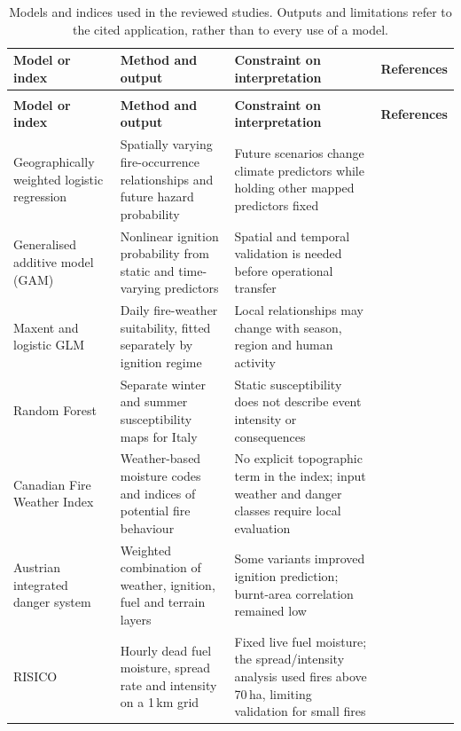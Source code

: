 \documentclass[11pt,a4paper]{article}
\begin{document}
\begingroup
\footnotesize
\setlength{\tabcolsep}{4pt}
\renewcommand{\arraystretch}{1.08}
\begin{longtable}{@{}>{\raggedright\arraybackslash}p{2.5cm} >{\raggedright\arraybackslash}p{3.6cm} >{\raggedright\arraybackslash}p{5.0cm} >{\raggedright\arraybackslash}p{3.5cm}@{}}
\caption{Models and indices used in the reviewed studies. Outputs and limitations refer to the cited application, rather than to every use of a model.}\label{tab:models}\\
\toprule
\textbf{Model or index} & \textbf{Method and output} & \textbf{Constraint on interpretation} & \textbf{References} \\
\midrule
\endfirsthead
\multicolumn{4}{l}{\tablename\ \thetable\ continued}\\
\toprule
\textbf{Model or index} & \textbf{Method and output} & \textbf{Constraint on interpretation} & \textbf{References} \\
\midrule
\endhead
\bottomrule
\endfoot
Geographically weighted logistic regression & Spatially varying fire-occurrence relationships and future hazard probability & Future scenarios change climate predictors while holding other mapped predictors fixed & \citep{gerberding_mapping_2025} \\
Generalised additive model (GAM) & Nonlinear ignition probability from static and time-varying predictors & Spatial and temporal validation is needed before operational transfer & \citep{moreno_1_nodate} \\
Maxent and logistic GLM & Daily fire-weather suitability, fitted separately by ignition regime & Local relationships may change with season, region and human activity & \citep{de_angelis_modelling_2015} \\
Random Forest & Separate winter and summer susceptibility maps for Italy & Static susceptibility does not describe event intensity or consequences & \citep{trucchia_defining_2022} \\
Canadian Fire Weather Index & Weather-based moisture codes and indices of potential fire behaviour & No explicit topographic term in the index; input weather and danger classes require local evaluation & \citep{arpaci_selecting_2013, zacharakis_environmental_2023} \\
Austrian integrated danger system & Weighted combination of weather, ignition, fuel and terrain layers & Some variants improved ignition prediction; burnt-area correlation remained low & \citep{muller_towards_2020} \\
RISICO & Hourly dead fuel moisture, spread rate and intensity on a 1\,km grid & Fixed live fuel moisture; the spread/intensity analysis used fires above 70\,ha, limiting validation for small fires & \citep{perello_fuelaware_2025} \\

\end{longtable}
\end{document}

